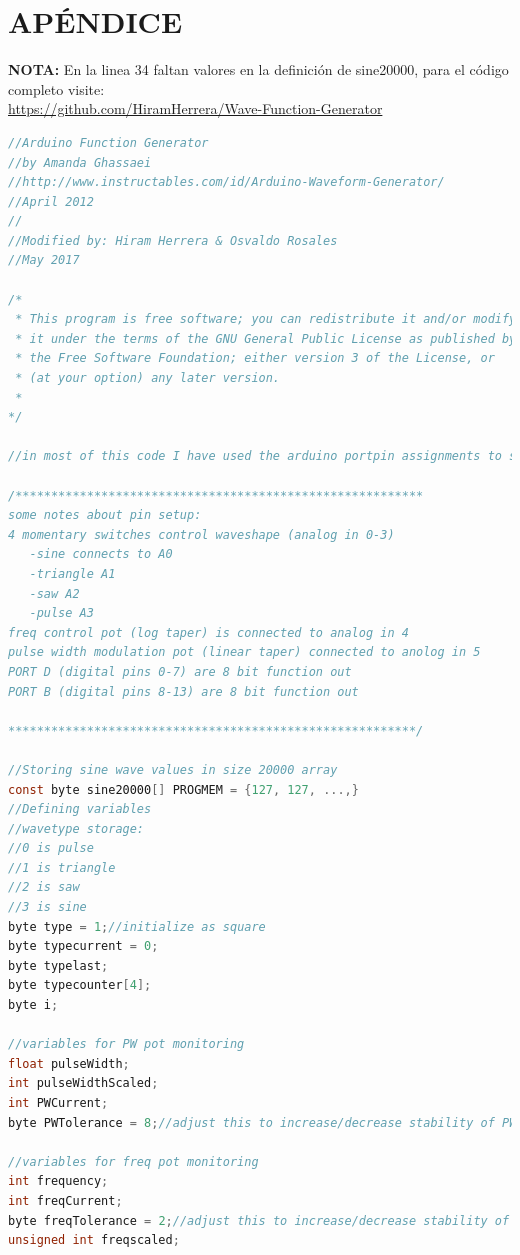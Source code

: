 \documentclass[11pt]{article}
\begin{document}



\clearpage
\newpage
\section*{APÉNDICE}
\noindent
\textbf{NOTA:} En la linea 34 faltan valores en la definición de sine20000, para el código completo visite: \\
\url{https://github.com/HiramHerrera/Wave-Function-Generator}
\begin{lstlisting}[language=C, caption=Código implementado para el generador de funciones, label = alg:code]
//Arduino Function Generator
//by Amanda Ghassaei
//http://www.instructables.com/id/Arduino-Waveform-Generator/
//April 2012
//
//Modified by: Hiram Herrera & Osvaldo Rosales
//May 2017

/*
 * This program is free software; you can redistribute it and/or modify
 * it under the terms of the GNU General Public License as published by
 * the Free Software Foundation; either version 3 of the License, or
 * (at your option) any later version.
 *
*/

//in most of this code I have used the arduino portpin assignments to send data to pins, you can read more about how that works here: http://www.arduino.cc/en/Reference/PortManipulation

/*********************************************************
some notes about pin setup:
4 momentary switches control waveshape (analog in 0-3)
   -sine connects to A0
   -triangle A1
   -saw A2
   -pulse A3
freq control pot (log taper) is connected to analog in 4
pulse width modulation pot (linear taper) connected to anolog in 5
PORT D (digital pins 0-7) are 8 bit function out
PORT B (digital pins 8-13) are 8 bit function out

*********************************************************/

//Storing sine wave values in size 20000 array
const byte sine20000[] PROGMEM = {127, 127, ...,}
//Defining variables
//wavetype storage:
//0 is pulse
//1 is triangle
//2 is saw
//3 is sine
byte type = 1;//initialize as square
byte typecurrent = 0;
byte typelast;
byte typecounter[4];
byte i;

//variables for PW pot monitoring
float pulseWidth;
int pulseWidthScaled;
int PWCurrent;
byte PWTolerance = 8;//adjust this to increase/decrease stability of PW measurement

//variables for freq pot monitoring
int frequency;
int freqCurrent;
byte freqTolerance = 2;//adjust this to increase/decrease stability of frequency measurement
unsigned int freqscaled;


\end{lstlisting}
\end{document}

